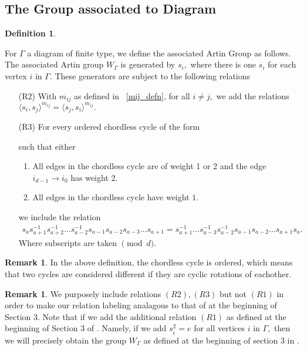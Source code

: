 \documentclass[11pt]{amsart}
\theoremstyle{definition}
\newtheorem{defn}[thm]{Definition}
\newtheorem{rem}[thm]{Remark}
\begin{document}
\subsection{The Group associated to Diagram}


\begin{defn} \label{grp def}

For $\Gamma$ a diagram of finite type, we define the associated Artin Group as follows. The associated Artin group $W_\Gamma$ is generated by $s_i,$ where there is one $s_i$ for each vertex $i$ in $\Gamma.$ These generators are subject to the following relations
\begin{itemize}
	\item[(R2)] With $m_{ij}$ as defined in ~\ref{mij_defn}, for all $i \neq j,$ we add the relations
	$\langle s_i,s_j \rangle^{m_{ij}}= \langle s_j,s_i \rangle^{m_{ij}}.$
	
\item[(R3)] For every ordered chordless cycle of the form


such that either
\begin{enumerate}
	\item All edges in the chordless cycle are of weight 1 or 2 and the edge $i_{d-1}\rightarrow i_0$ has weight 2.
	\item All edges in the chordless cycle have weight $1.$
\end{enumerate}
we include the relation
\begin{align*}
	s_{a}s_{a+1}^{-1}s_{a+2}^{-1}\dots s_{a-2}^{-1}s_{a-1}s_{a-2}s_{a-3}\dots s_{a+1} = s_{a+1}^{-1}\dots s_{a-3}^{-1}s_{a-2}^{-1}s_{a-1}s_{a-2}\dots s_{a+1}s_{a}.
\end{align*}
Where subscripts are taken $\pmod d.$ 
\end{itemize}
\end{defn}

\begin{rem}
In the above definition, the chordless cycle is ordered, which means that two cycles are considered different if they are cyclic rotations of eachother.
\end{rem}

\begin{rem}
We purposely include relations $(R2),(R3)$ but not $(R1)$ in order to make our relation labeling analagous to that of \cite{BM13} at the beginning of Section 3. Note that if we add the additional relation $(R1)$ as defined at the beginning of Section 3 of \cite{BM13}. Namely, if we add $s_i^2 = e$ for all vertices $i$ in $\Gamma,$ then we will precisely obtain the group $W_\Gamma$ as defined at the beginning of section 3 in \cite{BM13}.
\end{rem}
\end{document}
